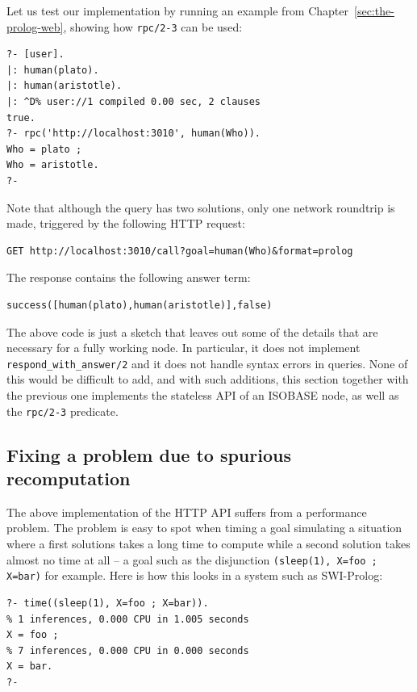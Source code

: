Let us test our implementation by running an example from Chapter~\ref{sec:the-prolog-web}, showing how \texttt{rpc/2-3} can be used:

\begin{verbatim}
?- [user].
|: human(plato).
|: human(aristotle).
|: ^D% user://1 compiled 0.00 sec, 2 clauses
true.
?- rpc('http://localhost:3010', human(Who)).
Who = plato ;
Who = aristotle.
?-
\end{verbatim}

\noindent Note that although the query has two solutions, only one network roundtrip is made, triggered by the following HTTP request:

\begin{verbatim}
GET http://localhost:3010/call?goal=human(Who)&format=prolog
\end{verbatim}

\noindent The response contains the following answer term:

\begin{verbatim}
success([human(plato),human(aristotle)],false)
\end{verbatim}

\noindent The above code is just a sketch that leaves out some of the details that are necessary for a fully working  node. In particular, it does not implement \texttt{respond\_with\_answer/2} and it does not handle syntax errors in queries. None of this would be difficult to add, and with such additions, this section together with the previous one implements the stateless API of an ISOBASE node, as well as the \texttt{rpc/2-3} predicate.


\subsection{Fixing a problem due to spurious recomputation}\label{sec:potential-problem}

The above implementation of the HTTP API suffers from a performance problem. The problem is easy to spot when timing a goal simulating a situation where a first solutions takes a long time to compute while a second solution takes almost no time at all -- a goal such as the disjunction \texttt{(sleep(1),\,X=foo\,;\,X=bar)} for example. Here is how this looks in a system such as SWI-Prolog:

\begin{verbatim}
?- time((sleep(1), X=foo ; X=bar)).
% 1 inferences, 0.000 CPU in 1.005 seconds
X = foo ;
% 7 inferences, 0.000 CPU in 0.000 seconds
X = bar.
?- 
\end{verbatim}

